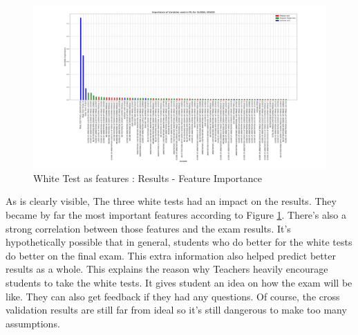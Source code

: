 \documentclass[a4paper,11pt]{report}
\numberwithin{figure}{section} %
\begin{document}
      \begin{figure}[H]
      \centering
      \includegraphics[width=.95\linewidth]{plots/test1_var_importance_GLOBAL_GRADE_2018-05-17_10_12_18.png}
      \caption{White Test as features : Results - Feature Importance}
      \label{fig:test1_2}
      \end{figure}
    As is clearly visible, The three white tests had an impact on the results.
    They became by far the most important features according to Figure \ref{fig:test1_2}.
    There's also a strong correlation between those features and the exam results.
    It's hypothetically possible that in general, students who do better for the white tests do better on the final exam.
    This extra information also helped predict better results as a whole.
    This explains the reason why Teachers heavily encourage students to take the white tests.
    It gives student an idea on how the exam will be like.
    They can also get feedback if they had any questions.
    Of course, the cross validation results are still far from ideal so it's still dangerous to make too many assumptions.\\
\end{document}
